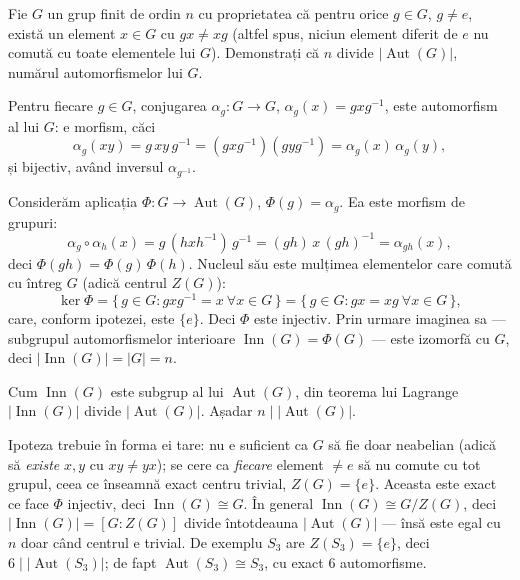\begin{problema}
Fie $G$ un grup finit de ordin $n$ cu proprietatea că pentru orice
$g\in G$, $g\neq e$, există un element $x\in G$ cu $gx\neq xg$ (altfel
spus, niciun element diferit de $e$ nu comută cu toate elementele lui
$G$). Demonstrați că $n$ divide $|\operatorname{Aut}(G)|$,
numărul automorfismelor lui $G$.
\end{problema}

\begin{solutie}
Pentru fiecare $g\in G$, conjugarea $\alpha_{g}:G\to G$,
$\alpha_{g}(x)=gxg^{-1}$, este automorfism al lui $G$: e morfism, căci
\[
  \alpha_{g}(xy)=g\,xy\,g^{-1}=(gxg^{-1})(gyg^{-1})=\alpha_{g}(x)\,\alpha_{g}(y),
\]
și bijectiv, având inversul $\alpha_{g^{-1}}$.

Considerăm aplicația $\Phi:G\to\operatorname{Aut}(G)$,
$\Phi(g)=\alpha_{g}$. Ea este morfism de grupuri:
\[
  \alpha_{g}\circ\alpha_{h}(x)=g\,(hxh^{-1})\,g^{-1}=(gh)\,x\,(gh)^{-1}=\alpha_{gh}(x),
\]
deci $\Phi(gh)=\Phi(g)\,\Phi(h)$. Nucleul său este mulțimea
elementelor care comută cu întreg $G$ (adică centrul $Z(G)$):
\[
  \ker\Phi=\{\,g\in G : gxg^{-1}=x \ \forall x\in G\,\}
          =\{\,g\in G : gx=xg \ \forall x\in G\,\},
\]
care, conform ipotezei, este $\{e\}$. Deci $\Phi$ este injectiv. Prin urmare imaginea sa --- subgrupul
automorfismelor interioare $\operatorname{Inn}(G)=\Phi(G)$ --- este
izomorfă cu $G$, deci $|\operatorname{Inn}(G)|=|G|=n$.

Cum $\operatorname{Inn}(G)$ este subgrup al lui $\operatorname{Aut}(G)$, din
teorema lui Lagrange $|\operatorname{Inn}(G)|$ divide $|\operatorname{Aut}(G)|$.
Așadar $n\mid|\operatorname{Aut}(G)|$.
\end{solutie}

\begin{obs}
Ipoteza trebuie în forma ei tare: nu e suficient ca $G$ să fie doar
neabelian (adică să \emph{existe} $x,y$ cu $xy\neq yx$); se cere ca
\emph{fiecare} element $\neq e$ să nu comute cu tot grupul, ceea ce
înseamnă exact centru trivial, $Z(G)=\{e\}$. Aceasta este exact ce
face $\Phi$ injectiv, deci $\operatorname{Inn}(G)\cong G$. În general
$\operatorname{Inn}(G)\cong G/Z(G)$, deci $|\operatorname{Inn}(G)|=[G:Z(G)]$
divide întotdeauna $|\operatorname{Aut}(G)|$ --- însă este egal
cu $n$ doar când centrul e trivial. De exemplu $S_{3}$ are
$Z(S_{3})=\{e\}$, deci $6\mid|\operatorname{Aut}(S_{3})|$; de fapt
$\operatorname{Aut}(S_{3})\cong S_{3}$, cu exact $6$ automorfisme.
\end{obs}

